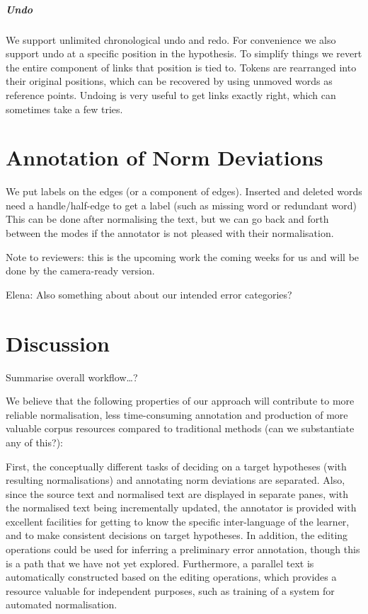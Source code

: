 \documentclass[10pt, a4paper]{article}
\begin{document}
\subparagraph{Undo} We support unlimited chronological undo and redo.
For convenience we also support undo at a specific position in the hypothesis.
To simplify things we revert the entire component of links that position
is tied to. Tokens are rearranged into their original positions, which
can be recovered by using unmoved words as reference points.
Undoing is very useful to get links exactly right, which can sometimes take a
few tries.

\section{Annotation of Norm Deviations}

%
We put labels on the edges (or a component of edges). Inserted and deleted words need a handle/half-edge to get
a label (such as missing word or redundant word)
This can be done after normalising the text, but we can go back and forth between the modes if the
annotator is not pleased with their normalisation.

Note to reviewers: this is the upcoming work the coming weeks for us and
will be done by the camera-ready version.
%

Elena: Also something about about our intended error categories?

\section{Discussion}

Summarise overall workflow\ldots ?

We believe that the following properties of our approach will contribute to more reliable normalisation, less time-consuming annotation and production of more valuable corpus resources compared to traditional methods (can we substantiate any of this?):

First, the conceptually different tasks of deciding on a target hypotheses (with resulting normalisations) and annotating norm deviations are separated. Also, since the source text and normalised text are displayed in separate panes, with the normalised text being incrementally updated, the annotator is provided with excellent facilities for getting to know the specific inter-language of the learner, and to make consistent decisions on target hypotheses. In addition, the editing operations could be used for inferring a preliminary error annotation, though this is a path that we have not yet explored. Furthermore, a parallel text is automatically constructed based on the editing operations, which provides a resource valuable for independent purposes, such as training of a system for automated normalisation.
\end{document}

